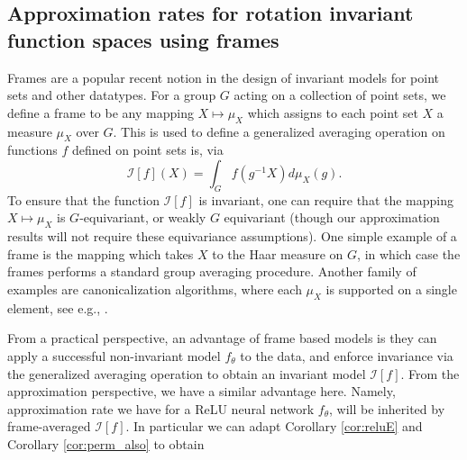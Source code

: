 \documentclass[twoside,11pt]{article}
\begin{document}

\subsection{Approximation rates for rotation  invariant function spaces using frames}\label{subsec:frames}
Frames are a popular recent notion in the design of invariant models for point sets and other datatypes. For a group $G$  acting on a collection of point sets, we define a frame to be any mapping $X\mapsto \mu_X$ which assigns to each point set $X$ a measure $\mu_X$ over $G$. This is used to define a generalized averaging operation on functions $f$ defined on point sets is, via 
\begin{equation}\label{eq:frame_avg}
\mathcal{I}[f](X)=\int_G f(g^{-1}X)d\mu_X(g).
\end{equation}
To ensure that the function $\mathcal{I}[f]$ is invariant, one can require that the mapping $X\mapsto \mu_X$ is $G$-equivariant, or weakly $G$ equivariant \cite{dym2024equivariant} (though our approximation results will not require these equivariance assumptions). One simple example of a frame is the mapping which takes $X$ to the Haar measure on $G$, in which case the frames performs a standard group averaging procedure. Another family of examples are canonicalization algorithms, where each $\mu_X$ is supported on a single element, see e.g., \cite{minimal_frame}.

From a practical perspective, an advantage of frame based models is they can apply a successful non-invariant model $f_\theta$ to the data, and enforce invariance via the generalized averaging operation to obtain an invariant model $\mathcal{I}[f]  $. From the approximation perspective, we have a similar advantage here. Namely, approximation rate we have for a ReLU neural network $f_\theta$, will be inherited by frame-averaged $\mathcal{I}[f]$. In particular we can adapt Corollary \ref{cor:reluE} and Corollary \ref{cor:perm_also} to obtain
\end{document}
